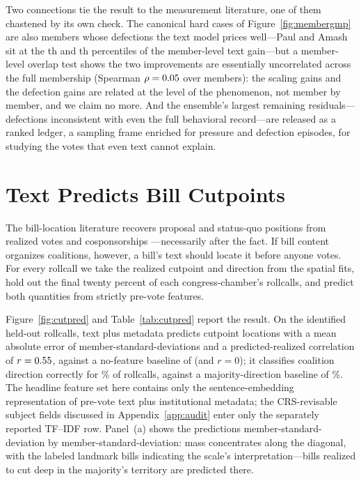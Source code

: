 \documentclass[12pt]{article}
\begin{document}
Two connections tie the result to the measurement literature, one of
them chastened by its own check. The canonical hard cases of
Figure~\ref{fig:membergmp} are also members whose defections the
text model prices well---Paul and Amash sit at the
\paulDefGainPct th and \amashDefGainPct th percentiles of the
member-level text gain---but a member-level
overlap test shows the two improvements are essentially uncorrelated
across the full membership (Spearman $\rho = 0.05$ over
\overlapN{} members): the scaling gains and the defection gains are
related at the level of the phenomenon, not member by member, and we
claim no more. And the ensemble's largest remaining
residuals---defections
inconsistent with even the full behavioral record---are released as a
ranked ledger, a sampling frame enriched for pressure and defection
episodes, for studying the votes that even text cannot explain.

\section{Text Predicts Bill Cutpoints}
\label{sec:cutpoints}

The bill-location literature recovers proposal and status-quo
positions from realized votes and cosponsorships
\citep{peress2013estimating, richman2011parties}---necessarily after
the fact. If bill content organizes coalitions, however, a bill's
text should locate it before anyone votes. For every rollcall we take
the realized cutpoint and direction from the spatial fits, hold out
the final twenty percent of each congress-chamber's rollcalls, and
predict both quantities from strictly pre-vote features.

Figure~\ref{fig:cutpred} and Table~\ref{tab:cutpred} report the
result. On the \cutTestN{} identified held-out rollcalls, text plus
metadata predicts cutpoint locations with a mean absolute error of
\cutComboMAE{} member-standard-deviations and a predicted-realized
correlation of $r = 0.55$, against a no-feature baseline of
\cutConstMAE{} (and $r = 0$); it classifies coalition direction
correctly for \dirCombo\% of rollcalls, against a
majority-direction baseline of \dirConst\%. The headline feature set
here contains only the sentence-embedding representation of pre-vote
text plus institutional metadata; the CRS-revisable subject fields
discussed in Appendix~\ref{app:audit} enter only the separately
reported TF--IDF row. Panel~(a) shows the predictions
member-standard-deviation by member-standard-deviation: mass
concentrates along the diagonal, with the labeled landmark bills
indicating the scale's interpretation---bills realized to cut deep in
the majority's territory are predicted there.
\end{document}
